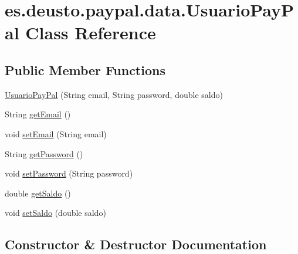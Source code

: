 \hypertarget{classes_1_1deusto_1_1paypal_1_1data_1_1_usuario_pay_pal}{}\section{es.\+deusto.\+paypal.\+data.\+Usuario\+Pay\+Pal Class Reference}
\label{classes_1_1deusto_1_1paypal_1_1data_1_1_usuario_pay_pal}
\subsection*{Public Member Functions}
\begin{DoxyCompactItemize}
\item 
\mbox{\hyperlink{classes_1_1deusto_1_1paypal_1_1data_1_1_usuario_pay_pal_a4ada89eda839a05466333ed5ca4e96cd}{Usuario\+Pay\+Pal}} (String email, String password, double saldo)
\item 
String \mbox{\hyperlink{classes_1_1deusto_1_1paypal_1_1data_1_1_usuario_pay_pal_a259df2056bc8dbe885cb6f6c5e9efd72}{get\+Email}} ()
\item 
void \mbox{\hyperlink{classes_1_1deusto_1_1paypal_1_1data_1_1_usuario_pay_pal_aa4bae1131217293f6948ae29b3b1c25d}{set\+Email}} (String email)
\item 
String \mbox{\hyperlink{classes_1_1deusto_1_1paypal_1_1data_1_1_usuario_pay_pal_aa05a592df14b4866258c39da3eab4793}{get\+Password}} ()
\item 
void \mbox{\hyperlink{classes_1_1deusto_1_1paypal_1_1data_1_1_usuario_pay_pal_aceafc47634a6fd3a37701ed7aad40893}{set\+Password}} (String password)
\item 
double \mbox{\hyperlink{classes_1_1deusto_1_1paypal_1_1data_1_1_usuario_pay_pal_a9fd632a0039d3d24e8e8bc4061f04fe9}{get\+Saldo}} ()
\item 
void \mbox{\hyperlink{classes_1_1deusto_1_1paypal_1_1data_1_1_usuario_pay_pal_a60bc14f0e90909f0aca8de4d5f1e7820}{set\+Saldo}} (double saldo)
\end{DoxyCompactItemize}


\subsection{Constructor \& Destructor Documentation}
\mbox{\label{classes_1_1deusto_1_1paypal_1_1data_1_1_usuario_pay_pal_a4ada89eda839a05466333ed5ca4e96cd}} 
